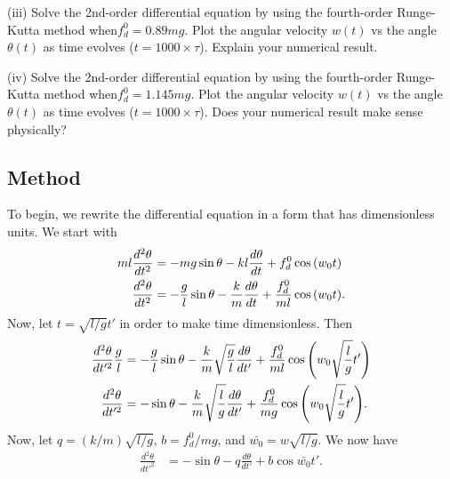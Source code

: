 \documentclass[10pt,letter]{article}
\begin{document}
(iii) Solve the 2nd-order differential equation by using the fourth-order Runge-Kutta method
when$f_d^0= 0.89mg$. Plot the angular velocity $w(t)$ vs the angle $\theta(t)$ as time evolves ($t = 1000 \times \tau$).
Explain your numerical result.

(iv) Solve the 2nd-order differential equation by using the fourth-order Runge-Kutta method
when$f_d^0= 1.145mg$. Plot the angular velocity $w(t)$ vs the angle $\theta(t)$ as time evolves ($t = 1000 \times \tau$).
Does your numerical result make sense physically?

\subsection{Method}

To begin, we rewrite the differential equation in a form that has dimensionless units. We start with
\begin{align}
ml\frac{d^2\theta}{dt^2} &= -mg\sin\theta - kl \frac{d\theta}{dt} + f_d^0\cos{(w_0t)} \notag \\
\frac{d^2\theta}{dt^2} &= -\frac{g}{l}\sin\theta - \frac{k}{m} \frac{d\theta}{dt} + \frac{f_d^0}{ml}\cos{(w_0t)}.
\end{align}
Now, let $t=\sqrt{l/g}t'$ in order to make time dimensionless. Then
\begin{align}
\frac{d^2\theta}{dt'^2}\frac{g}{l} &= -\frac{g}{l}\sin\theta - \frac{k}{m} \sqrt{\frac{g}{l}}\frac{d\theta}{dt'} + \frac{f_d^0}{ml}\cos{\left(w_0\sqrt{\frac{l}{g}}t'\right)} \notag \\
\frac{d^2\theta}{dt'^2} &= -\sin\theta - \frac{k}{m} \sqrt{\frac{l}{g}}\frac{d\theta}{dt'} + \frac{f_d^0}{mg}\cos{\left(w_0\sqrt{\frac{l}{g}}t'\right)}.
\end{align}
Now, let $q=(k/m)\sqrt{l/g}$, $b= f_d^0/mg$, and $\bar{w_0} = w\sqrt{l/g}$. We now have
\begin{align}
\frac{d^2\theta}{dt'^2}&= -\sin\theta - q\frac{d\theta}{dt'} +b\cos{\bar{w_0}t'}.
\end{align}
\end{document}
